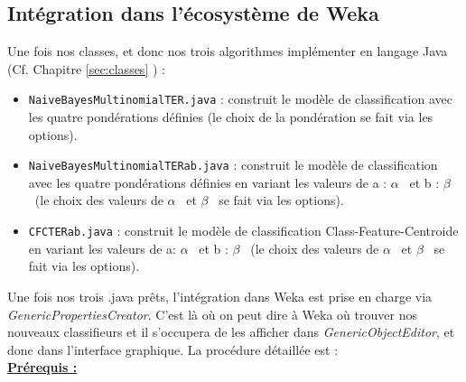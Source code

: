 \documentclass{article}
\begin{document}
\subsection{Intégration dans l'écosystème de Weka}
Une fois nos classes, et donc nos trois algorithmes implémenter en langage Java (Cf. Chapitre \ref{sec:classes} ) :
\begin{itemize}
\item  \texttt{NaiveBayesMultinomialTER.java} : construit le modèle de classification avec les quatre pondérations définies (le choix de la pondération se fait via les options).
\item  \texttt{NaiveBayesMultinomialTERab.java} : construit le modèle de classification avec les quatre pondérations définies en variant les valeurs de a : $\alpha$ \ et b : $\beta$ \ (le choix des valeurs de $\alpha$ \ et $\beta$ \ se fait via les options).
\item  \texttt{CFCTERab.java} : construit le modèle de classification Class-Feature-Centroide en variant les valeurs de a: $\alpha$ \ et b : $\beta$ \ (le choix des valeurs de $\alpha$ \ et $\beta$ \ se fait via les options).
\end{itemize}
Une fois nos trois .java prêts, l'intégration dans Weka est prise en charge via  \textit{GenericPropertiesCreator}. C'est là où on peut dire à Weka où trouver nos nouveaux classifieurs et il s'occupera de les afficher dans  \textit{GenericObjectEditor}, et donc dans l'interface graphique. La procédure détaillée est : \\
\textbf{\underline{Prérequis :}}
\end{document}
